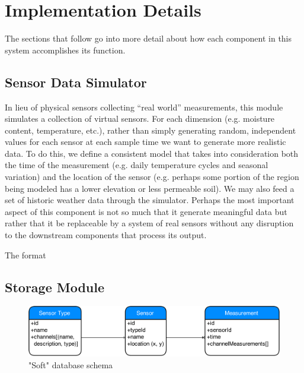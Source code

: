 \documentclass{article}
\begin{document}

\section{Implementation Details}
The sections that follow go into more detail about how each component in this system
accomplishes its function. 

\subsection{Sensor Data Simulator}
In lieu of physical sensors collecting ``real world'' measurements,
this module simulates a collection of virtual sensors.
For each dimension (e.g. moisture content, temperature, etc.), rather than simply
generating random, independent values for each sensor at each sample time
we want to generate more realistic data.
To do this, we define a consistent model that takes into consideration both
the time of the measurement (e.g. daily temperature cycles and seasonal variation) and
the location of the sensor (e.g. perhaps some portion of the region being modeled has a lower elevation or less permeable soil).
We may also feed a set of historic weather data through the simulator.
Perhaps the most important aspect of this component is not so much that it generate meaningful data
but rather that it be replaceable by a system of real sensors without any disruption to the downstream
components that process its output.

The format 


\subsection{Storage Module}


\begin{figure}[htb]
\begin{center}
   \includegraphics[width=1\linewidth]{Images/DB-Schema.png}
\end{center}
\vspace{-0.2in}
   \caption{"Soft" database schema}
   \label{fig:db-soft-schema}
\end{figure}
\end{document}

